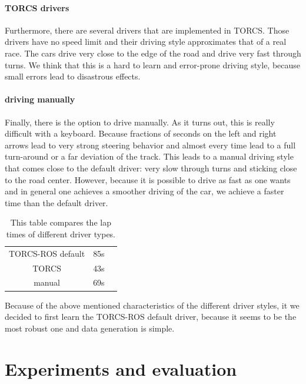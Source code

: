 \documentclass[10pt,a4paper,twoside,journal]{IEEEtran}
\begin{document}
\paragraph{TORCS drivers}
Furthermore, there are several drivers that are implemented in TORCS. Those drivers have no speed limit and their driving style approximates that of a real race. The cars drive very close to the edge of the road and drive very fast through turns. We think that this is a hard to learn and error-prone driving style, because small errors lead to disastrous effects.
\paragraph{driving manually}
Finally, there is the option to drive manually. As it turns out, this is really difficult with a keyboard. Because fractions of seconds on the left and right arrows lead to very strong steering behavior and almost every time lead to a full turn-around or a far deviation of the track. This leads to a manual driving style that comes close to the default driver: very slow through turns and sticking close to the road center. However, because it is possible to drive as fast as one wants and in general one achieves a smoother driving of the car, we achieve a faster time than the default driver. \\

\begin{table}[ht]
	\centering
		\begin{tabular}{ |c|c|c| } 
			\hline
			TORCS-ROS default & 85s \\
			TORCS  & 43s  \\
			manual & 69s \\
			\hline
		\end{tabular}
		\caption{\label{tab:torcs_laptime}This table compares the lap times of different driver types.}
\end{table}
Because of the above mentioned characteristics of the different driver styles, it we decided to first learn the TORCS-ROS default driver, because it seems to be the most robust one and data generation is simple.

\section{Experiments and evaluation}
\label{sc:evaluation}
\end{document}
